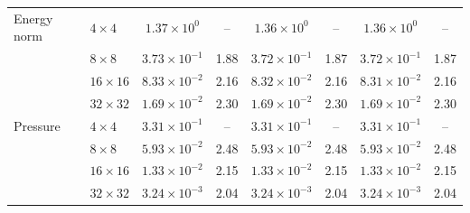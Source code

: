 \documentclass[11pt,a4paper]{article}
\numberwithin{equation}{section}
\theoremstyle{plain}
\theoremstyle{definition}
\theoremstyle{remark}
\begin{document}
\begin{table}[htbp]
\begin{tabular}{llcc|cc|cc}

\addlinespace
Energy norm & $4\times4$ & $1.37\times10^{0}$ & -- & $1.36\times10^{0}$ & -- & $1.36\times10^{0}$ & -- \\
& $8\times8$ & $3.73\times10^{-1}$ & 1.88 & $3.72\times10^{-1}$ & 1.87 & $3.72\times10^{-1}$ & 1.87 \\
& $16\times16$ & $8.33\times10^{-2}$ & 2.16 & $8.32\times10^{-2}$ & 2.16 & $8.31\times10^{-2}$ & 2.16 \\
& $32\times32$ & $1.69\times10^{-2}$ & 2.30 & $1.69\times10^{-2}$ & 2.30 & $1.69\times10^{-2}$ & 2.30 \\


\addlinespace
Pressure & $4\times4$ & $3.31\times10^{-1}$ & -- & $3.31\times10^{-1}$ & -- & $3.31\times10^{-1}$ & -- \\
& $8\times8$ & $5.93\times10^{-2}$ & 2.48 & $5.93\times10^{-2}$ & 2.48 & $5.93\times10^{-2}$ & 2.48 \\
& $16\times16$ & $1.33\times10^{-2}$ & 2.15 & $1.33\times10^{-2}$ & 2.15 & $1.33\times10^{-2}$ & 2.15 \\
& $32\times32$ & $3.24\times10^{-3}$ & 2.04 & $3.24\times10^{-3}$ & 2.04 & $3.24\times10^{-3}$ & 2.04 \\



\end{tabular}
\end{table}
\end{document}
